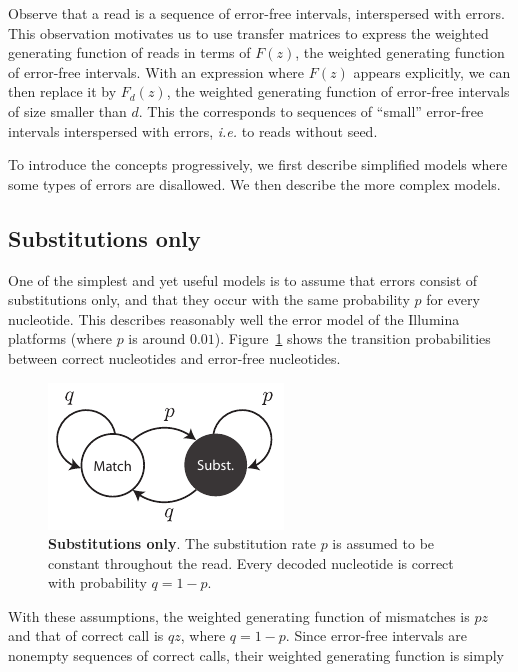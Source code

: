 \documentclass{article}
\begin{document}
Observe that a read is a sequence of error-free intervals, interspersed
with errors. This observation motivates us to use transfer matrices to
express the weighted generating function of reads in terms of $F(z)$, the
weighted generating function of error-free intervals. With an expression
where $F(z)$ appears explicitly, we can then replace it by $F_d(z)$, the
weighted generating function of error-free intervals of size smaller than
$d$. This the corresponds to sequences of ``small'' error-free intervals
interspersed with errors, \textit{i.e.} to reads without seed.

To introduce the concepts progressively, we first describe simplified
models where some types of errors are disallowed. We then describe the
more complex models.






\subsection{Substitutions only}
\label{sec:substitutions}

One of the simplest and yet useful models is to assume that errors consist
of substitutions only, and that they occur with the same probability $p$
for every nucleotide. This describes reasonably well the error model of
the Illumina platforms (where $p$ is around $0.01$).
Figure~\ref{fig:subonly} shows the transition probabilities between
correct nucleotides and error-free nucleotides.

\begin{figure}[h]
\centering
\includegraphics[scale=0.9]{substitutions_only.pdf}
\caption{\textbf{Substitutions only}. 
The substitution rate $p$ is assumed to be constant throughout the read.
Every decoded nucleotide is correct with probability $q = 1-p$.}
\label{fig:subonly}
\end{figure}

With these assumptions, the weighted generating function of mismatches is
$pz$ and that of correct call is $qz$, where $q=1-p$. Since 
error-free intervals are nonempty sequences of correct calls, their
weighted generating function is simply
\end{document}
